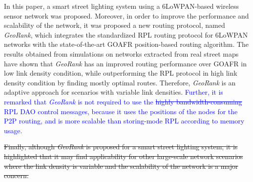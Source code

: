 \documentclass[authoryear,preprint,review,12pt]{elsarticle}
\newcommand{\rev}{\textcolor{blue}}
\begin{document}
In this paper, a smart street lighting system using a 6LoWPAN-based wireless sensor network was proposed. Moreover, in order to improve the performance and scalability of the network, it was proposed a new routing protocol, named \textit{GeoRank}, which integrates the standardized RPL routing protocol for 6LoWPAN networks with the state-of-the-art GOAFR position-based routing algorithm. The results obtained from simulations on networks extracted from real street maps have shown that \textit{GeoRank} has an improved routing performance over GOAFR in low link density condition, while outperforming the RPL protocol in high link density condition by finding mostly optimal routes. Therefore, \textit{GeoRank} is an adaptive approach for scenarios with variable link densities.  \rev{Further, it is remarked that \textit{GeoRank} is not required to use the \sout{highly bandwidth-consuming} RPL DAO control messages, because it uses the positions of the nodes for the P2P routing, and is more scalable than storing-mode RPL according to memory usage.} 

\sout{Finally, although \textit{GeoRank} is proposed for a smart street lighting system, it is highlighted that it may find applicability for other large-scale network scenarios where the link density is variable and the scalability of the network is a major concern.}

%




\end{document}
